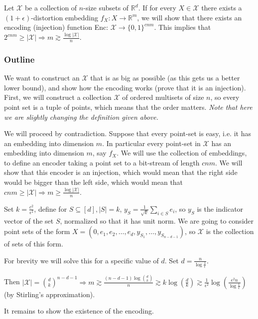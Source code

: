 \documentclass[11pt]{article}
\newcommand{\R}{\mathbb{R}}
\begin{document}
Let $\mathcal{X}$ be a collection of $n$-size subsets of $\R^d$. If for every $X \in \mathcal{X}$ there exists a $(1+\epsilon)$-distortion embedding $f_X: X\rightarrow \R^m$, we will show that there exists an encoding (injection) function Enc: $\mathcal{X} \rightarrow \{0, 1\}^{cnm}$. This implies that $2^{cnm}\geq |\mathcal{X}| \Rightarrow m\gtrsim \frac{\log |\mathcal{X}|}{n}$.

\subsubsection{Outline}

We want to construct an $\mathcal{X}$ that is as big as possible (as this gets us a better lower bound), and show how the encoding works (prove that it is an injection). First, we will construct a collection $\mathcal{X}$ of ordered multisets of size $n$, so every point set is a tuple of points, which means that the order matters. \textit{Note that here we are slightly changing the definition given above.}

We will proceed by contradiction. Suppose that every point-set is easy, i.e. it has an embedding into dimension $m$. In particular every point-set in $\mathcal{X}$ has an embedding into dimension $m$, say $f_X$. We will use the collection of embeddings, to define an encoder taking a point set to a bit-stream of length $cnm$. We will show that this encoder is an injection, which would mean that the right side would be bigger than the left side, which would mean that $cnm\geq|\mathcal{X}| \Rightarrow m\geq \frac{\log{|\mathcal{X}|}}{n}$.

Set $k=\frac{c^2}{\epsilon^2}$, define for $S\subseteq [d], |S|=k$, $y_S=\frac{1}{\sqrt{k}} \sum_{i\in S} e_i$, so $y_S$ is the indicator vector of the set $S$, normalized so that it has unit norm. We are going to consider point sets of the form $X=(0, e_1, e_2, \ldots, e_d, y_{S_1}, \ldots, y_{S_{n-d-1}})$, so $\mathcal{X}$ is the collection of sets of this form.

For brevity we will solve this for a specific value of $d$. Set $d=\frac{n}{\log \frac{1}{\epsilon}}$.

Then $|\mathcal{X}|=\binom{d}{k}^{n-d-1} \Rightarrow m\gtrsim \frac{(n-d-1)\log\binom{d}{k}}{n} \gtrsim k\log(\frac{d}{k})\gtrsim \frac{1}{\epsilon^2}\log(\frac{\epsilon^2 n}{\log\frac{1}{\epsilon}})$ (by Stirling's approximation).

It remains to show the existence of the encoding.

\end{document}
